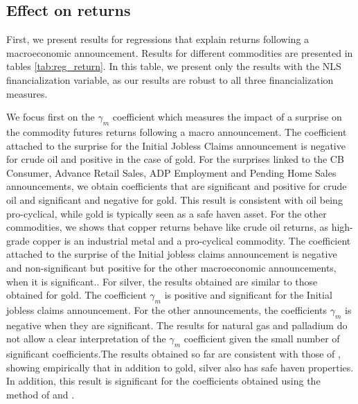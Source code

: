 \documentclass[12pt]{article}
\begin{document}
\subsection{Effect on returns}
First, we present results for regressions that explain returns following a macroeconomic announcement. Results for different commodities are presented in tables \ref{tab:reg_return}. In this table, we present only the results with the NLS financialization variable, as our results are robust to all three financialization measures.

We focus first on the $\gamma_m$ coefficient which measures the impact of a surprise on the commodity futures returns following a macro announcement. The coefficient attached to the surprise for the Initial Jobless Claims announcement is negative for crude oil and positive in the case of gold. For the surprises linked to the CB Consumer, Advance Retail Sales, ADP Employment and Pending Home Sales announcements, we obtain coefficients that are significant and positive for crude oil and significant and negative for gold. This result is consistent with oil being pro-cyclical, while gold is typically seen as a safe haven asset. For the other commodities, we shows that copper returns behave like crude oil returns, as high-grade copper is an industrial metal and a pro-cyclical commodity. The coefficient attached to the surprise of the Initial jobless claims announcement is negative and non-significant but positive for the other macroeconomic announcements, when it is significant.. For silver, the results obtained are similar to those obtained for gold. The coefficient $\gamma_m$ is positive and significant for the Initial jobless claims announcement. For the other announcements, the coefficients $\gamma_m$ is negative when they are significant. The results for natural gas and palladium do not allow a clear interpretation of the $\gamma_m$ coefficient given the small number of significant coefficients.The results obtained so far are consistent with those of \citet{lucey2015precious}, showing empirically that in addition to gold, silver also has safe haven properties.
In addition, this result is significant for the coefficients obtained using the method of \citet{kurov2019price} and \citet{andersen2007real}.
\end{document}
